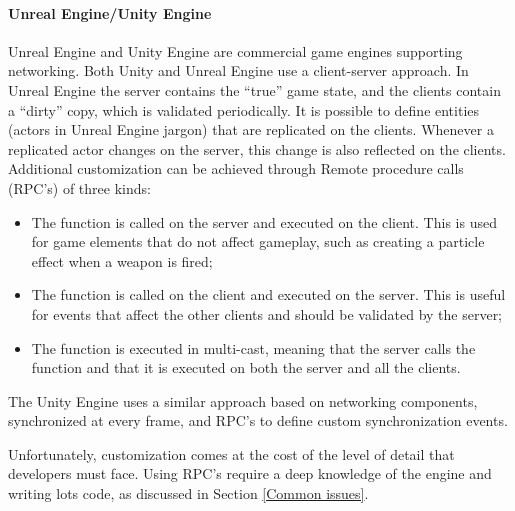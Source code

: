 \paragraph{Unreal Engine/Unity Engine} Unreal Engine \cite{games2006unreal} and Unity Engine \cite{engine9unity} are commercial game engines supporting networking.  Both Unity and Unreal Engine use a client-server approach. In Unreal Engine 
the server contains the ``true'' game state, and the clients contain a ``dirty'' copy, which is validated periodically. It is possible to define entities (actors in Unreal Engine jargon) that are replicated on the clients. Whenever a replicated actor changes on the server, this change is also reflected on the clients. Additional customization can be achieved through Remote procedure calls (RPC's) of three kinds:
\begin{itemize}
	\item The function is called on the server and executed on the client. This is used for game elements that do not affect gameplay, such as creating a particle effect when a weapon is fired;
	\item The function is called on the client and executed on the server. This is useful for events that affect the other clients and should be validated by the server;
	\item The function is executed in multi-cast, meaning that the server calls the function and that it is executed on both the server and all the clients.
\end{itemize}

The Unity Engine uses a similar approach based on networking components, synchronized at every frame, and RPC's to define custom synchronization events.

Unfortunately, customization comes at the cost of the level of detail that developers must face. Using RPC's require a deep knowledge of the engine and writing lots code, as discussed in Section \ref{Common issues}.